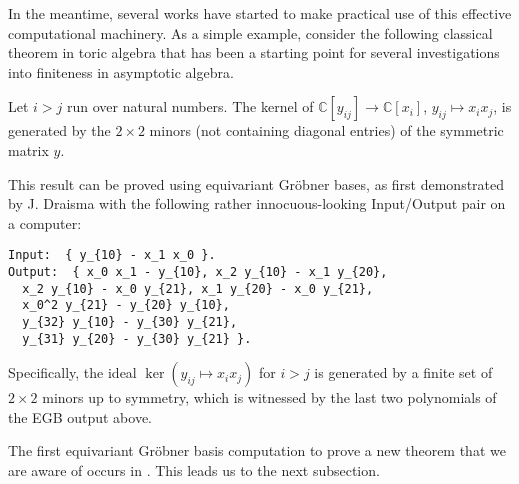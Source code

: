 In the meantime, several works have started to make practical use of this effective computational machinery.  As a simple example, consider 
the following classical theorem in toric algebra that has been a starting point for several investigations into finiteness in asymptotic algebra.

\begin{theorem}\label{toric2x2}
Let $i > j$ run over natural numbers.  The kernel of $\mathbb C[y_{ij}] \to \mathbb C[x_i]$, $y_{ij} \mapsto x_i x_j$, is generated by the $2 \times 2$ minors (not containing diagonal entries) of the symmetric matrix $y$.
\end{theorem}

This result can be proved using equivariant Gr\"obner bases, as first demonstrated by J. Draisma with the following rather innocuous-looking Input/Output pair on a computer:
\begin{verbatim}
Input:  { y_{10} - x_1 x_0 }.
Output:  { x_0 x_1 - y_{10}, x_2 y_{10} - x_1 y_{20},
  x_2 y_{10} - x_0 y_{21}, x_1 y_{20} - x_0 y_{21},
  x_0^2 y_{21} - y_{20} y_{10},
  y_{32} y_{10} - y_{30} y_{21},  
  y_{31} y_{20} - y_{30} y_{21} }.
\end{verbatim}
Specifically, the ideal $\ker{(y_{ij} \mapsto x_i x_j)}$ for $i > j$ is generated by a finite set of $2 \times 2$ minors up to symmetry, 
which is witnessed by the last two polynomials of the EGB output above.

The first equivariant Gr\"obner basis computation to prove a new theorem that we are aware of occurs in \cite{Brouwer09e}. This leads us to the next subsection. 
